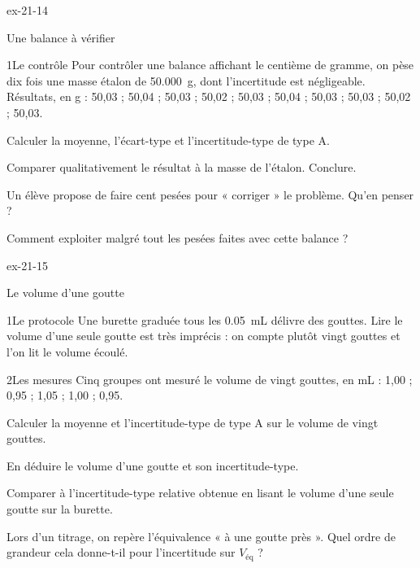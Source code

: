 \begin{blocLivre}{ex-21-14}
\begin{exercice}[3]{Une balance à vérifier}
\begin{docu}{1}{Le contrôle}
Pour contrôler une balance affichant le centième de gramme, on pèse dix fois une masse étalon de \qty{50,000}{g}, dont l'incertitude est
négligeable. Résultats, en g : 50,03 ; 50,04 ; 50,03 ; 50,02 ; 50,03 ; 50,04 ; 50,03 ; 50,03 ; 50,02 ; 50,03.
\end{docu}
\begin{questions}
\item Calculer la moyenne, l'écart-type et l'incertitude-type de type A.
\item Comparer qualitativement le résultat à la masse de l'étalon. Conclure.
\item \initiative Un élève propose de faire cent pesées pour « corriger » le problème. Qu'en penser ?
\item Comment exploiter malgré tout les pesées faites avec cette balance ?
\end{questions}
\end{exercice}
\end{blocLivre}
\begin{blocLivre}{ex-21-15}
\begin{exercice}[3]{Le volume d'une goutte}
\begin{docu}{1}{Le protocole}
Une burette graduée tous les \qty{0,05}{mL} délivre des gouttes. Lire le volume d'une seule goutte est très imprécis : on compte plutôt
vingt gouttes et l'on lit le volume écoulé.
\end{docu}
\begin{docu}{2}{Les mesures}
Cinq groupes ont mesuré le volume de vingt gouttes, en mL : 1,00 ; 0,95 ; 1,05 ; 1,00 ; 0,95.
\end{docu}
\begin{questions}
\item Calculer la moyenne et l'incertitude-type de type A sur le volume de vingt gouttes.
\item En déduire le volume d'une goutte et son incertitude-type.
\item \initiative Comparer à l'incertitude-type relative obtenue en lisant le volume d'une seule goutte sur la burette.
\item Lors d'un titrage, on repère l'équivalence « à une goutte près ». Quel ordre de grandeur cela donne-t-il pour l'incertitude sur $V_\text{éq}$ ?
\end{questions}
\end{exercice}
\end{blocLivre}
